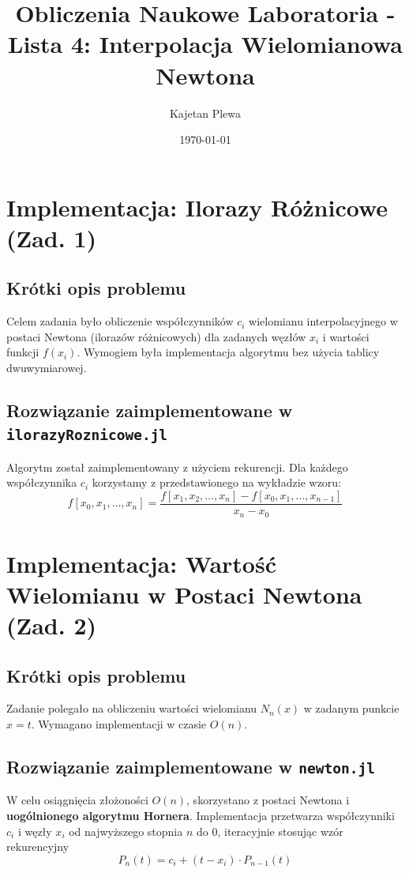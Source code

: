 \documentclass[11pt, a4paper]{article}
\title{\vspace{-2cm}\textbf{Obliczenia Naukowe Laboratoria - Lista 4: Interpolacja Wielomianowa Newtona}}
\author{Kajetan Plewa}
\date{\today}
\begin{document}
	\maketitle
	\thispagestyle{empty}
	
	\section{Implementacja: Ilorazy Różnicowe (Zad. 1)}
	
	\subsection{Krótki opis problemu}
	Celem zadania było obliczenie współczynników $c_i$ wielomianu interpolacyjnego w postaci Newtona (ilorazów różnicowych) dla zadanych węzłów $x_i$ i wartości funkcji $f(x_i)$.  Wymogiem była implementacja algorytmu bez użycia tablicy dwuwymiarowej.
	
	\subsection{Rozwiązanie zaimplementowane w \texttt{ilorazyRoznicowe.jl}}
	Algorytm został zaimplementowany z użyciem rekurencji. \newline
	Dla każdego współczynnika $c_i$ korzystamy z przedstawionego na wykładzie wzoru: \newline
	\begin{equation}
		f[x_0, x_1, \dots, x_n] = \frac{f[x_1, x_2, \dots, x_n]-f[x_0, x_1, \dots, x_{n-1}]}{x_n-x_0}
	\end{equation}
	
	\newpage
	\section{Implementacja: Wartość Wielomianu w Postaci Newtona (Zad. 2)}
	
	\subsection{Krótki opis problemu}
	Zadanie polegało na obliczeniu wartości wielomianu $N_n(x)$ w zadanym punkcie $x=t$. Wymagano implementacji w czasie $O(n)$.
	
	\subsection{Rozwiązanie zaimplementowane w \texttt{newton.jl}}
	W celu osiągnięcia złożoności $O(n)$, skorzystano z postaci Newtona i \textbf{uogólnionego algorytmu Hornera}. Implementacja przetwarza współczynniki $c_i$ i węzły $x_i$ od najwyższego stopnia $n$ do $0$, iteracyjnie stosując wzór rekurencyjny
	\begin{equation}
		P_n(t) = c_i + (t - x_i) \cdot P_{n-1}(t)
	\end{equation}
	
\end{document}
